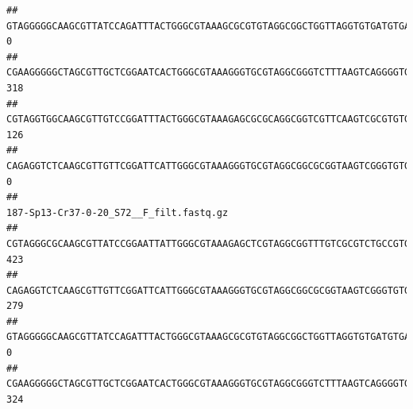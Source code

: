 \documentclass[]{article}
\begin{document}
\begin{verbatim}
## GTAGGGGGCAAGCGTTATCCAGATTTACTGGGCGTAAAGCGCGTGTAGGCGGCTGGTTAGGTGTGATGTGAAATCTTCCGGCTCAACCGGAAAACTGCATTGCAAACCGGCCTGGCTAGAGTGCAGGAGAGGGAAGCGGAATTCCAGGTGTAGCGGTGAAATGCGTAGATATCTGGAGGAACACCAGTGGCGAAGGCGGCTTCCTGGCCTGCAACTGACGCTGAGACGCGAAAGCGTGGGGAGCGAAC                                        0
## CGAAGGGGGCTAGCGTTGCTCGGAATCACTGGGCGTAAAGGGTGCGTAGGCGGGTCTTTAAGTCAGGGGTGAAATCCTGGAGCTCAACTCCAGAACTGCCTTTGATACTGAAGATCTTGAGTTCGGGAGAGGTGAGTGGAACTGCGAGTGTAGAGGTGAAATTCGTAGATATTCGCAAGAACACCAGTGGCGAAGGCGGCTCACTGGCCCGATACTGACGCTGAGGCACGAAAGCGTGGGGAGCAAACA                                     318
## CGTAGGTGGCAAGCGTTGTCCGGATTTACTGGGCGTAAAGAGCGCGCAGGCGGTCGTTCAAGTCGCGTGTGAAAGCCCCCGGCTCAACTGGGGAGGGTCACGCGATACTGATCGACTCGAAGGCAGGAGAGGGTAGTGGAATTCCCGGTGTAGTGGTGAAATGCGTAGATATCGGGAGGAACACCAGTGGCGAAGGCGACTACCTGGCCTGTTCTTGACGCTGAGGCGCGAAAGCTAGGGGAGCAAACG                                     126
## CAGAGGTCTCAAGCGTTGTTCGGATTCATTGGGCGTAAAGGGTGCGTAGGCGGCGCGGTAAGTCGGGTGTGAAATCTCGGGGCTTAACTCCGAAACTGCATTCGATACTGCCGTGCTTGAGGACTGGAGAGGAGACTGGAATTTACGGTGTAGCGGTGAAATGCGTAGATATCGTAAGGAAGACCAGTGGCGAAGGCGGGTCTCTGGACAGTTCCTGACGCTGAGGCACGAAGGCCAGGGGAGCAAACG                                       0
##                                                                                                                                                                                                                                                           187-Sp13-Cr37-0-20_S72__F_filt.fastq.gz
## CGTAGGGCGCAAGCGTTATCCGGAATTATTGGGCGTAAAGAGCTCGTAGGCGGTTTGTCGCGTCTGCCGTGAAAGTCCGGGGCTCAACTCCGGATCTGCGGTGGGTACGGGCAGACTAGAGTGATGTAGGGGAGACTGGAATTCCTGGTGTAGCGGTGAAATGCGCAGATATCAGGAGGAACACCGATGGCGAAGGCAGGTCTCTGGGCATTAACTGACGCTGAGGAGCGAAAGCATGGGGAGCGAACA                                     423
## CAGAGGTCTCAAGCGTTGTTCGGATTCATTGGGCGTAAAGGGTGCGTAGGCGGCGCGGTAAGTCGGGTGTGAAATCTCGGAGCTTAACTCCGAAACTGCATTCGATACTGCCGTGCTTGAGGACTGGAGAGGAGACTGGAATTTACGGTGTAGCGGTGAAATGCGTAGATATCGTAAGGAAGACCAGTGGCGAAGGCGGGTCTCTGGACAGTTCCTGACGCTGAGGCACGAAGGCCAGGGGAGCAAACG                                     279
## GTAGGGGGCAAGCGTTATCCAGATTTACTGGGCGTAAAGCGCGTGTAGGCGGCTGGTTAGGTGTGATGTGAAATCTTCCGGCTCAACCGGAAAACTGCATTGCAAACCGGCCTGGCTAGAGTGCAGGAGAGGGAAGCGGAATTCCAGGTGTAGCGGTGAAATGCGTAGATATCTGGAGGAACACCAGTGGCGAAGGCGGCTTCCTGGCCTGCAACTGACGCTGAGACGCGAAAGCGTGGGGAGCGAAC                                        0
## CGAAGGGGGCTAGCGTTGCTCGGAATCACTGGGCGTAAAGGGTGCGTAGGCGGGTCTTTAAGTCAGGGGTGAAATCCTGGAGCTCAACTCCAGAACTGCCTTTGATACTGAAGATCTTGAGTTCGGGAGAGGTGAGTGGAACTGCGAGTGTAGAGGTGAAATTCGTAGATATTCGCAAGAACACCAGTGGCGAAGGCGGCTCACTGGCCCGATACTGACGCTGAGGCACGAAAGCGTGGGGAGCAAACA                                     324

\end{verbatim}
\end{document}
